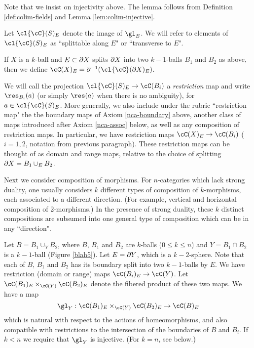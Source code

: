 Note that we insist on injectivity above. 
The lemma follows from Definition \ref{def:colim-fields} and Lemma \ref{lem:colim-injective}.

Let $\cl{\cC}(S)_E$ denote the image of $\gl_E$.
We will refer to elements of $\cl{\cC}(S)_E$ as ``splittable along $E$" or ``transverse to $E$". 

If $X$ is a $k$-ball and $E \subset \partial X$ splits $\partial X$ into two $k{-}1$-balls $B_1$ and $B_2$
as above, then we define $\cC(X)_E = \bd^{-1}(\cl{\cC}(\bd X)_E)$.

We will call the projection $\cl{\cC}(S)_E \to \cC(B_i)$
a {\it restriction} map and write $\res_{B_i}(a)$
(or simply $\res(a)$ when there is no ambiguity), for $a\in \cl{\cC}(S)_E$.
More generally, we also include under the rubric ``restriction map" the
the boundary maps of Axiom \ref{nca-boundary} above,
another class of maps introduced after Axiom \ref{nca-assoc} below, as well as any composition
of restriction maps.
In particular, we have restriction maps $\cC(X)_E \to \cC(B_i)$
($i = 1, 2$, notation from previous paragraph).
These restriction maps can be thought of as 
domain and range maps, relative to the choice of splitting $\partial X = B_1 \cup_E B_2$.


Next we consider composition of morphisms.
For $n$-categories which lack strong duality, one usually considers
$k$ different types of composition of $k$-morphisms, each associated to a different direction.
(For example, vertical and horizontal composition of 2-morphisms.)
In the presence of strong duality, these $k$ distinct compositions are subsumed into 
one general type of composition which can be in any ``direction".

\begin{axiom}[Composition]
Let $B = B_1 \cup_Y B_2$, where $B$, $B_1$ and $B_2$ are $k$-balls ($0\le k\le n$)
and $Y = B_1\cap B_2$ is a $k{-}1$-ball (Figure \ref{blah5}).
Let $E = \partial Y$, which is a $k{-}2$-sphere.
Note that each of $B$, $B_1$ and $B_2$ has its boundary split into two $k{-}1$-balls by $E$.
We have restriction (domain or range) maps $\cC(B_i)_E \to \cC(Y)$.
Let $\cC(B_1)_E \times_{\cC(Y)} \cC(B_2)_E$ denote the fibered product of these two maps. 
We have a map
\[
	\gl_Y : \cC(B_1)_E \times_{\cC(Y)} \cC(B_2)_E \to \cC(B)_E
\]
which is natural with respect to the actions of homeomorphisms, and also compatible with restrictions
to the intersection of the boundaries of $B$ and $B_i$.
If $k < n$ we require that $\gl_Y$ is injective.
(For $k=n$, see below.)
\end{axiom}

